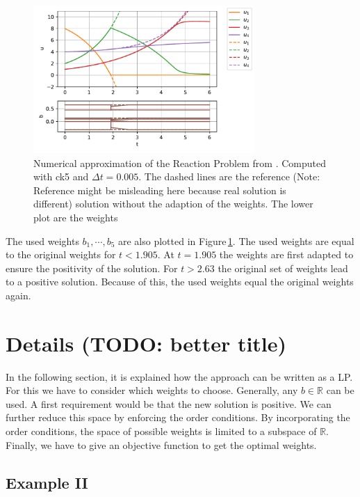 \documentclass[a4paper]{scrartcl}
\numberwithin{equation}{section}
\theoremstyle{plain}
\theoremstyle{definition}
\numberwithin{theorem}{section}
\newcommand{\R}{\mathbb{R}}
\newcommand{\dt}{{\Delta t}}
\newcommand{\1}{\mathbbm{1}}
\begin{document}
\begin{figure}[h]
    \centering
    \includegraphics[width=0.75\textwidth]{plots/exampleI.pdf}
    \caption{Numerical approximation of the Reaction Problem from \cite{kopecz_comparison_2019}. Computed with ck5 and $\dt = 0.005$. The dashed lines are the reference (Note: Reference might be misleading here because real solution is different) solution without the adaption of the weights. The lower plot are the weights }
    \label{fig:exampleI}
\end{figure}

The used weights $b_1,\cdots,b_5$ are also plotted in Figure\,\ref{fig:exampleI}. 
The used weights are equal to the original weights for $t<1.905$. At $t=1.905$ the weights are first adapted to ensure the positivity of the solution. For $t>2.63$ the original set of weights lead to a positive solution. Because of this, the used weights equal the original weights again.


\section{Details (TODO: better title)}\label{sec:LP}

In the following section, it is explained how the approach can be written as a LP. 
For this we have to consider which weights to choose. 
Generally, any $b \in \R$ can be used. 
A first requirement would be that the new solution is positive.
We can further reduce this space by enforcing the order conditions. 
By incorporating the order conditions, the space of possible weights is limited to a subspace of $\R$. %
Finally, we have to give an objective function to get the optimal weights.


\subsection{Example II}\label{sec:example_lin}
\end{document}
